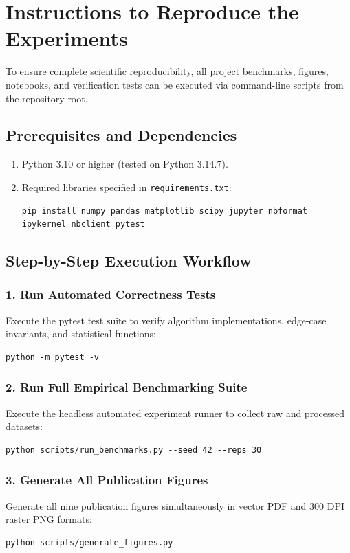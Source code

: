 \chapter{Instructions to Reproduce the Experiments}
\label{app:reproduction}

To ensure complete scientific reproducibility, all project benchmarks, figures, notebooks, and verification tests can be executed via command-line scripts from the repository root.

\section{Prerequisites and Dependencies}
\begin{enumerate}
    \item Python 3.10 or higher (tested on Python 3.14.7).
    \item Required libraries specified in \texttt{requirements.txt}:
\begin{verbatim}
pip install numpy pandas matplotlib scipy jupyter nbformat ipykernel nbclient pytest
\end{verbatim}
\end{enumerate}

\section{Step-by-Step Execution Workflow}

\subsection{1. Run Automated Correctness Tests}
Execute the pytest test suite to verify algorithm implementations, edge-case invariants, and statistical functions:
\begin{verbatim}
python -m pytest -v
\end{verbatim}

\subsection{2. Run Full Empirical Benchmarking Suite}
Execute the headless automated experiment runner to collect raw and processed datasets:
\begin{verbatim}
python scripts/run_benchmarks.py --seed 42 --reps 30
\end{verbatim}

\subsection{3. Generate All Publication Figures}
Generate all nine publication figures simultaneously in vector PDF and 300 DPI raster PNG formats:
\begin{verbatim}
python scripts/generate_figures.py
\end{verbatim}

